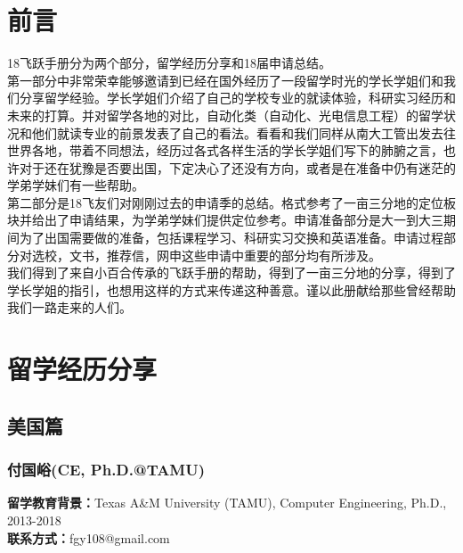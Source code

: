 \documentclass[a4paper,UTF8]{book}
\begin{document}
\chapter{前言}
\thispagestyle{fancy}
{\begin{spacing}{1.5}
\fontsize{12pt}{12pt}\selectfont
{
18飞跃手册分为两个部分，留学经历分享和18届申请总结。\\

第一部分中非常荣幸能够邀请到已经在国外经历了一段留学时光的学长学姐们和我们分享留学经验。学长学姐们介绍了自己的学校专业的就读体验，科研实习经历和未来的打算。并对留学各地的对比，自动化类（自动化、光电信息工程）的留学状况和他们就读专业的前景发表了自己的看法。看看和我们同样从南大工管出发去往世界各地，带着不同想法，经历过各式各样生活的学长学姐们写下的肺腑之言，也许对于还在犹豫是否要出国，下定决心了还没有方向，或者是在准备中仍有迷茫的学弟学妹们有一些帮助。\\

第二部分是18飞友们对刚刚过去的申请季的总结。格式参考了一亩三分地的定位板块并给出了申请结果，为学弟学妹们提供定位参考。申请准备部分是大一到大三期间为了出国需要做的准备，包括课程学习、科研实习交换和英语准备。申请过程部分对选校，文书，推荐信，网申这些申请中重要的部分均有所涉及。\\

我们得到了来自小百合传承的飞跃手册的帮助，得到了一亩三分地的分享，得到了学长学姐的指引，也想用这样的方式来传递这种善意。谨以此册献给那些曾经帮助我们一路走来的人们。
}
\end{spacing}
}

\clearpage


\chapter{留学经历分享}  %
\thispagestyle{empty}
\pagestyle{fancy}
\fancyhf{}
\fancyhead[EL,OR]{\subsectionmark}
\fancyfoot[EC,OC]{\thepage}
\fancyhead[ER,OL]{\nouppercase{\leftmark}---\nouppercase{\rightmark}}
\renewcommand{\chaptermark}[1]{\markboth{#1}{}}
\renewcommand{\sectionmark}[1]{\markright{#1}{}}
\clearpage
\section{美国篇}
\subsection{付国峪(CE, Ph.D.@TAMU)}
    \textbf{留学教育背景：}Texas A\&M University (TAMU), Computer Engineering, Ph.D., 2013-2018\\
    \textbf{联系方式：}fgy108@gmail.com
\end{document}
